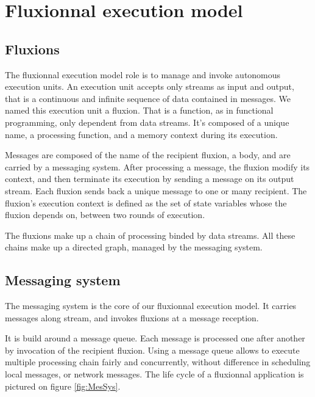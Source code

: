 \section{Fluxionnal execution model}

\subsection{Fluxions}

The fluxionnal execution model role is to manage and invoke autonomous execution units.
An execution unit accepts only streams as input and output, that is a continuous and infinite sequence of data contained in messages.
We named this execution unit a fluxion.
That is a function, as in functional programming, only dependent from data streams.
It's composed of a unique name, a processing function, and a memory context during its execution.

Messages are composed of the name of the recipient fluxion, a body, and are carried by a messaging system.
After processing a message, the fluxion modify its context, and then terminate its execution by sending a message on its output stream.
Each fluxion sends back a unique message to one or many recipient.
The fluxion's execution context is defined as the set of state variables whose the fluxion depends on, between two rounds of execution.

The fluxions make up a chain of processing binded by data streams.
All these chains make up a directed graph, managed by the messaging system.

\subsection{Messaging system}

The messaging system is the core of our fluxionnal execution model.
It carries messages along stream, and invokes fluxions at a message reception.

It is build around a message queue.
Each message is processed one after another by invocation of the recipient fluxion.
Using a message queue allows to execute multiple processing chain fairly and concurrently, without difference in scheduling local messages, or network messages.
The life cycle of a fluxionnal application is pictured on figure \ref{fig:MesSys}.

